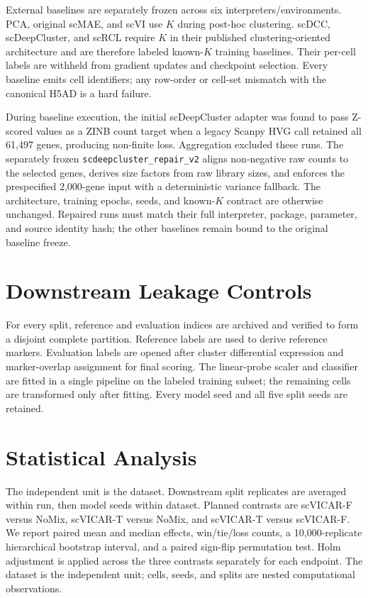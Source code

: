 \documentclass[11pt]{article}
\begin{document}
External baselines are separately frozen across six interpreters/environments.
PCA, original scMAE, and scVI use $K$ during post-hoc clustering. scDCC,
scDeepCluster, and scRCL require $K$
in their published clustering-oriented architecture and are therefore labeled
known-$K$ training baselines.  Their per-cell labels are withheld from gradient
updates and checkpoint selection.  Every baseline emits cell identifiers; any
row-order or cell-set mismatch with the canonical H5AD is a hard failure.

During baseline execution, the initial scDeepCluster adapter was found to pass
Z-scored values as a ZINB count target when a legacy Scanpy HVG call retained
all 61,497 genes, producing non-finite loss. Aggregation excluded these runs.
The separately frozen \texttt{scdeepcluster\_repair\_v2} aligns non-negative raw
counts to the selected genes, derives size factors from raw library sizes, and
enforces the prespecified 2,000-gene input with a deterministic variance
fallback.  The architecture, training epochs, seeds, and known-$K$ contract are
otherwise unchanged.  Repaired runs must match their full interpreter,
package, parameter, and source identity hash; the other baselines remain bound
to the original baseline freeze.

\section{Downstream Leakage Controls}

For every split, reference and evaluation indices are archived and verified to
form a disjoint complete partition.  Reference labels are used to derive
reference markers. Evaluation labels are opened after cluster differential
expression and marker-overlap assignment for final scoring. The linear-probe
scaler and classifier are fitted in a
single pipeline on the labeled training subset; the remaining cells are
transformed only after fitting.  Every model seed and all five split seeds are
retained.

\section{Statistical Analysis}

The independent unit is the dataset.  Downstream split replicates are averaged
within run, then model seeds within dataset.  Planned contrasts are scVICAR-F
versus NoMix, scVICAR-T versus NoMix, and scVICAR-T versus scVICAR-F.  We report
paired mean and median effects, win/tie/loss counts, a 10,000-replicate
hierarchical bootstrap interval, and a paired sign-flip permutation test.
Holm adjustment is applied across the three contrasts separately for each
endpoint. The dataset is the independent unit; cells, seeds, and splits are
nested computational observations.
\end{document}
